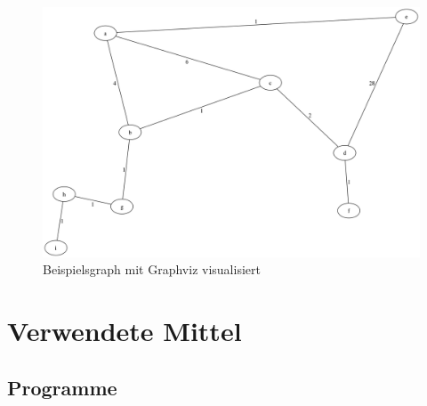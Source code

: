 \documentclass[a4paper,titlepage]{article}
\begin{document}
\begin{figure}[h!]
\begin{center}
\includegraphics[width=\textwidth]{screenshot/example_dot.png}
\end{center}
\caption{Beispielsgraph mit Graphviz visualisiert}
\end{figure}

\newpage

\section{Verwendete Mittel}

\subsection{Programme}
\end{document}
